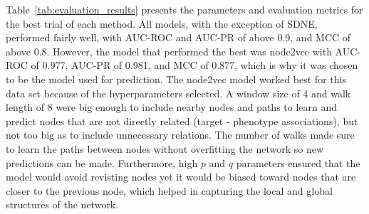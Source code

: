Table~\ref{tab:evaluation_results} presents the parameters and evaluation metrics for the best trial of each method.
All models, with the exception of \ac{SDNE}, performed fairly well, with AUC-ROC and AUC-PR of above 0.9, and MCC of above 0.8.
However, the model that performed the best was node2vec with AUC-ROC of 0.977, AUC-PR of 0.981, and \ac{MCC} of 0.877, which is why it was chosen to be the model used for prediction.
The node2vec model worked best for this data set because of the hyperparameters selected.
A window size of 4 and walk length of 8 were big enough to include nearby nodes and paths to learn and predict nodes that are not directly related (target - phenotype associations), but not too big as to include unnecessary relations.
The number of walks made sure to learn the paths between nodes without overfitting the network so new predictions can be made.
Furthermore, high $p$ and $q$ parameters ensured that the model would avoid revisting nodes yet it would be biased toward nodes that are closer to the previous node, which helped in capturing the local and global structures of the network.


